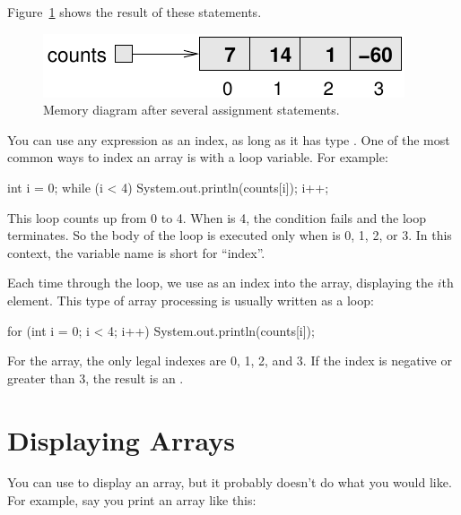 Figure~\ref{fig.array2} shows the result of these statements.

\begin{figure}[!ht]
\begin{center}
\includegraphics{figs/array2.pdf}
\caption{Memory diagram after several assignment statements.}
\label{fig.array2}
\end{center}
\end{figure}

You can use any expression as an index, as long as it has type .
One of the most common ways to index an array is with a loop variable.
For example:

\begin{code}
int i = 0;
while (i < 4) {
    System.out.println(counts[i]);
    i++;
}
\end{code}

This  loop counts up from 0 to 4.
When  is 4, the condition fails and the loop terminates.
So the body of the loop is executed only when  is 0, 1, 2, or 3.
In this context, the variable name  is short for ``index''.


Each time through the loop, we use  as an index into the array, displaying the $i$th element.
This type of array processing is usually written as a  loop:

\begin{code}
for (int i = 0; i < 4; i++) {
    System.out.println(counts[i]);
}
\end{code}


For the  array, the only legal indexes are 0, 1, 2, and 3.
If the index is negative or greater than 3, the result is an .


\section{Displaying Arrays}
\label{printarray}


You can use  to display an array, but it probably doesn't do what you would like.
For example, say you print an array like this:

